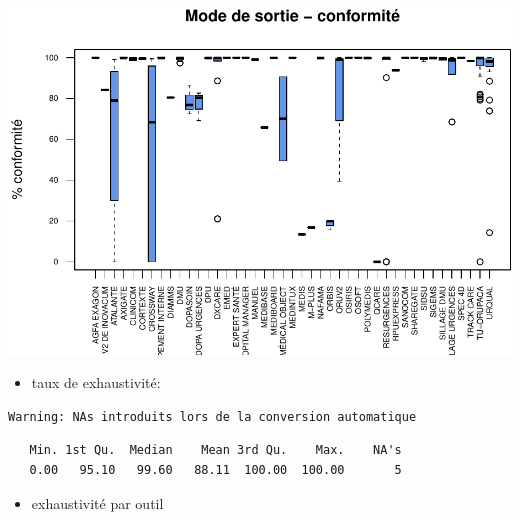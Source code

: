 \documentclass[]{article}
\begin{document}
\includegraphics{septembre2015_files/figure-latex/unnamed-chunk-23-1.pdf}

\begin{itemize}
\itemsep1pt\parskip0pt
\item
  taux de exhaustivité:
\end{itemize}

\begin{verbatim}
Warning: NAs introduits lors de la conversion automatique
\end{verbatim}

\begin{verbatim}
   Min. 1st Qu.  Median    Mean 3rd Qu.    Max.    NA's 
   0.00   95.10   99.60   88.11  100.00  100.00       5 
\end{verbatim}

\begin{itemize}
\itemsep1pt\parskip0pt
\item
  exhaustivité par outil
\end{itemize}
\end{document}
